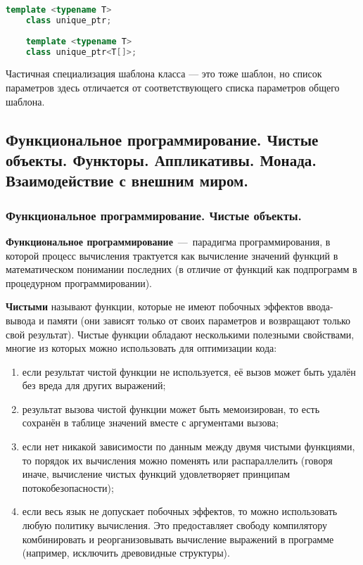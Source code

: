 \documentclass{article}
\begin{document}
\begin{lstlisting}[language=C++]
	template <typename T>
	class unique_ptr;
	
	template <typename T>
	class unique_ptr<T[]>;
\end{lstlisting}
Частичная специализация шаблона класса — это тоже шаблон, но список параметров здесь отличается от соответствующего списка параметров общего шаблона.

\subsection{Функциональное программирование. Чистые объекты. Функторы. Аппликативы. Монада. Взаимодействие с внешним миром.}

\subsubsection{Функциональное программирование. Чистые объекты.}
\textbf{Функциональное программирование}~---~парадигма программирования, в которой процесс вычисления трактуется как вычисление значений функций в математическом понимании последних (в отличие от функций как подпрограмм в процедурном программировании).

\textbf{Чистыми} называют функции, которые не имеют побочных эффектов ввода-вывода и памяти (они зависят только от своих параметров и возвращают только свой результат). Чистые функции обладают несколькими полезными свойствами, многие из которых можно использовать для оптимизации кода:
\begin{enumerate}
	\item если результат чистой функции не используется, её вызов может быть удалён без вреда для других выражений;
	\item результат вызова чистой функции может быть мемоизирован, то есть сохранён в таблице значений вместе с аргументами вызова;
	\item если нет никакой зависимости по данным между двумя чистыми функциями, то порядок их вычисления можно поменять или распараллелить (говоря иначе, вычисление чистых функций удовлетворяет принципам потокобезопасности);
	\item если весь язык не допускает побочных эффектов, то можно использовать любую политику вычисления. Это предоставляет свободу компилятору комбинировать и реорганизовывать вычисление выражений в программе (например, исключить древовидные структуры).
\end{enumerate}
\end{document}

